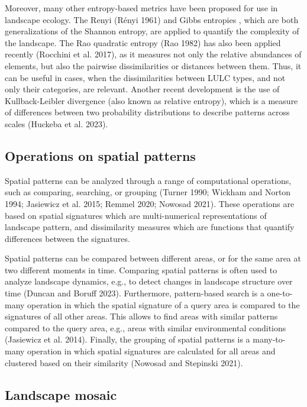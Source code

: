 \documentclass[
  10pt,
  a4paperpaper,
]{article}
\begin{document}
Moreover, many other entropy-based metrics have been proposed for use in
landscape ecology. The Renyi (Rényi 1961) and Gibbs entropies , which
are both generalizations of the Shannon entropy, are applied to quantify
the complexity of the landscape. The Rao quadratic entropy (Rao 1982)
has also been applied recently (Rocchini et al. 2017), as it measures
not only the relative abundances of elements, but also the pairwise
dissimilarities or distances between them. Thus, it can be useful in
cases, when the dissimilarities between LULC types, and not only their
categories, are relevant. Another recent development is the use of
Kullback-Leibler divergence (also known as relative entropy), which is a
measure of differences between two probability distributions to describe
patterns across scales (Huckeba et al. 2023).

\subsection{Operations on spatial
patterns}\label{operations-on-spatial-patterns}

Spatial patterns can be analyzed through a range of computational
operations, such as comparing, searching, or grouping (Turner 1990;
Wickham and Norton 1994; Jasiewicz et al. 2015; Remmel 2020; Nowosad
2021). These operations are based on spatial signatures which are
multi-numerical representations of landscape pattern, and dissimilarity
measures which are functions that quantify differences between the
signatures.

Spatial patterns can be compared between different areas, or for the
same area at two different moments in time. Comparing spatial patterns
is often used to analyze landscape dynamics, e.g., to detect changes in
landscape structure over time (Duncan and Boruff 2023). Furthermore,
pattern-based search is a one-to-many operation in which the spatial
signature of a query area is compared to the signatures of all other
areas. This allows to find areas with similar patterns compared to the
query area, e.g., areas with similar environmental conditions (Jasiewicz
et al. 2014). Finally, the grouping of spatial patterns is a
many-to-many operation in which spatial signatures are calculated for
all areas and clustered based on their similarity (Nowosad and Stepinski
2021).

\subsection{Landscape mosaic}\label{landscape-mosaic}
\end{document}
